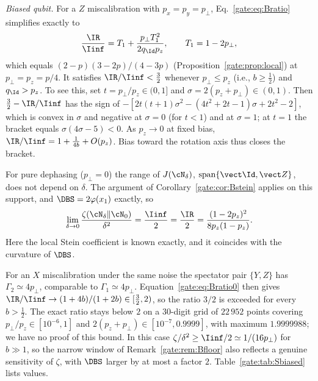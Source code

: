 \emph{Biased qubit.} For a $Z$ miscalibration with $p_x=p_y=p_\perp$, Eq.~\eqref{gate:eq:Bratio} simplifies exactly to
\begin{equation}\label{gate:eq:BRZ}
\frac{\IR}{\Iinf}=T_1+\frac{p_\perp T_1^2}{2q_\Id p_z},\qquad T_1=1-2p_\perp,
\end{equation}
which equals $(2-p)(3-2p)/(4-3p)$ (Proposition~\ref{gate:prop:local}) at $p_\perp=p_z=p/4$. It satisfies $\IR/\Iinf<\frac32$ whenever $p_\perp\le p_z$ (i.e., $b\ge\frac12$) and $q_\Id>p_z$. To see this, set $t=p_\perp/p_z\in(0,1]$ and $\sigma=2(p_z+p_\perp)\in(0,1)$. Then $\frac32-\IR/\Iinf$ has the sign of $-[2t(t+1)\sigma^2-(4t^2+2t-1)\sigma+2t^2-2]$, which is convex in $\sigma$ and negative at $\sigma=0$ (for $t<1$) and at $\sigma=1$; at $t=1$ the bracket equals $\sigma(4\sigma-5)<0$. As $p_z\to0$ at fixed bias, $\IR/\Iinf=1+\frac1{4b}+O(p_z)$. Bias toward the rotation axis thus closes the bracket.

For pure dephasing ($p_\perp=0$) the range of $J(\cN_\delta)$, $\mathrm{span}\{\vect\Id,\vect Z\}$, does not depend on $\delta$. The argument of Corollary~\ref{gate:cor:Bstein} applies on this support, and $\DBS=2\varphi(x_1)$ exactly, so
\begin{equation}\label{gate:eq:Bdeph}
\lim_{\delta\to0}\frac{\zeta(\cN_\delta\|\cN_0)}{\delta^2}=\frac{\Iinf}2=\frac{\IR}2=\frac{(1-2p_z)^2}{8p_z(1-p_z)}.
\end{equation}
Here the local Stein coefficient is known exactly, and it coincides with the curvature of $\DBS$.

For an $X$ miscalibration under the same noise the spectator pair $\{Y,Z\}$ has $\Gamma_2\simeq4p_\perp$, comparable to $\Gamma_1\simeq4p_\perp$. Equation~\eqref{gate:eq:Bratio0} then gives $\IR/\Iinf\to(1+4b)/(1+2b)\in[\frac32,2)$, so the ratio $3/2$ is exceeded for every $b>\frac12$. The exact ratio stays below $2$ on a 30-digit grid of $22\,952$ points covering $p_\perp/p_z\in[10^{-6},1]$ and $2(p_z+p_\perp)\in[10^{-7},0.9999]$, with maximum $1.9999988$; we have no proof of this bound. In this case $\zeta/\delta^2\ge\Iinf/2\simeq1/(16p_\perp)$ for $b\gg1$, so the narrow window of Remark~\ref{gate:rem:Bfloor} also reflects a genuine sensitivity of $\zeta$, with $\DBS$ larger by at most a factor $2$. Table~\ref{gate:tab:Sbiased} lists values.

